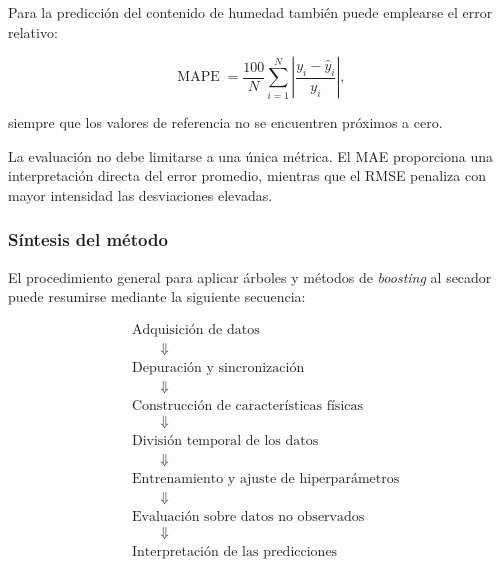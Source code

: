 Para la predicción del contenido de humedad también puede emplearse el error relativo:

\begin{equation}
\operatorname{MAPE}
=
\frac{100}{N}
\sum_{i=1}^{N}
\left|
\frac{
y_i-\hat{y}_i
}{
y_i
}
\right|,
\end{equation}

siempre que los valores de referencia no se encuentren próximos a cero.

La evaluación no debe limitarse a una única métrica. El MAE proporciona una interpretación directa del error promedio, mientras que el RMSE penaliza con mayor intensidad las desviaciones elevadas.

\subsubsection{Síntesis del método}

El procedimiento general para aplicar árboles y métodos de \textit{boosting} al secador puede resumirse mediante la siguiente secuencia:

\begin{equation}
\boxed{
\begin{aligned}
&\text{Adquisición de datos}
\\
&\qquad\Downarrow
\\
&\text{Depuración y sincronización}
\\
&\qquad\Downarrow
\\
&\text{Construcción de características físicas}
\\
&\qquad\Downarrow
\\
&\text{División temporal de los datos}
\\
&\qquad\Downarrow
\\
&\text{Entrenamiento y ajuste de hiperparámetros}
\\
&\qquad\Downarrow
\\
&\text{Evaluación sobre datos no observados}
\\
&\qquad\Downarrow
\\
&\text{Interpretación de las predicciones}
\end{aligned}
}
\end{equation}

